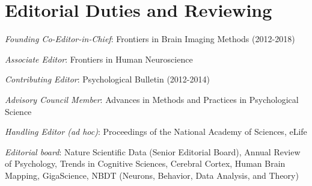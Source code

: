 \section*{Editorial Duties and Reviewing} 
\noindent 

\textit{Founding Co-Editor-in-Chief}: Frontiers in Brain Imaging Methods (2012-2018) 

\textit{Associate Editor}: Frontiers in Human Neuroscience 

\textit{Contributing Editor}: Psychological Bulletin (2012-2014) 

\textit{Advisory Council Member}: Advances in Methods and Practices in Psychological Science 

\textit{Handling Editor (ad hoc)}: Proceedings of the National Academy of Sciences, eLife 

\textit{Editorial board}: Nature Scientific Data (Senior Editorial Board), Annual Review of Psychology, Trends in Cognitive Sciences, Cerebral Cortex, Human Brain Mapping, GigaScience, NBDT (Neurons, Behavior, Data Analysis, and Theory) 

